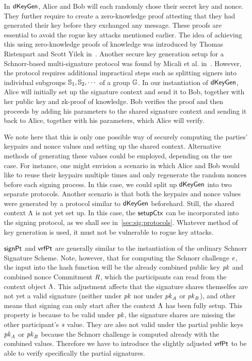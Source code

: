 In $\mathsf{dKeyGen}$, Alice and Bob will each randomly chose their secret key and nonce.
They further require to create a zero-knowledge proof attesting that they had generated their key before they exchanged any message.
These proofs are essential to avoid the rogue key attacks mentioned earlier.
The idea of achieving this using zero-knowledge proofs of knowledge was introduced by Thomas Ristenpart and Scott Yilek in~\cite{ristenpart2007power}.
Another secure key generation setup for a Schnorr-based multi-signature protocol was found by Micali et al. in~\cite{micali2001accountable}.
However, the protocol requires additional impractical steps such as splitting signers into individual subgroups $\mathbb{S}_1, \mathbb{S}_{2}, \cdots$ of a group $\mathbb{G}$.
In our instantiation of $\mathsf{dKeyGen}$, Alice will initially set up the signature context and send it to Bob, together with her public key and zk-proof of knowledge.
Bob verifies the proof and then proceeds by adding his parameters to the shared signature context and sending it back to Alice, together with his parameters, which Alice will verify.

We note here that this is only one possible way of securely computing the parties' keypairs and nonce values and setting up the shared context.
Alternative methods of generating these values could be employed, depending on the use case.
For instance, one might envision a scenario in which Alice and Bob would like to reuse their keypairs multiple times and only regenerate the random nonces before each signing process.
In this case, we could split up $\mathsf{dKeyGen}$ into two separate protocols.
Another scenario is that both the keypairs and nonce values were generated by a protocol similar to $\mathsf{dKeyGen}$ beforehard.
Still, the shared context $\Lambda$ is not yet set up.
In this case, the $\mathsf{setupCtx}$ can be incorporated into the signing protocol, as we shall see in~\cref{sec:sig:protocols}.
Whatever method of key generation is used, it must not be vulnerable to rogue key attacks.

$\mathsf{signPt}$ and $\mathsf{vrfPt}$ are generally similar to the instantiation of the ordinary Schnorr Signature Scheme.
Note, however, that for computing the Schnorr challenge $\mathit{e}$, the input into the hash function will be the already combined public key $\mathit{pk}$ and combined nonce Commitment $\mathit{R}$, which the participants can read from the context object $\Lambda$.
This adjustment affects that the signature shares themselfes are not yet a valid signature (neither under $\mathit{pk}$ nor under $\mathit{pk}_{\mathit{A}}$ or $\mathit{pk}_{\mathit{B}}$), and other means that signing can only start after the context $\Lambda$ has been fully setup.
This property is because to be valid under $\mathit{pk}$, the signature shares are missing the other participant's $\mathit{s}$ value.
They are also not valid under the partial public keys $\mathit{pk}_{\mathit{A}}$ or $\mathit{pk}_{\mathit{B}}$ because the Schnorr challenge is computed already with the combined values.
Therefore we have to introduce the slightly adjusted $\mathsf{vrfPt}$ to be able to verify specifically the partial signatures.

